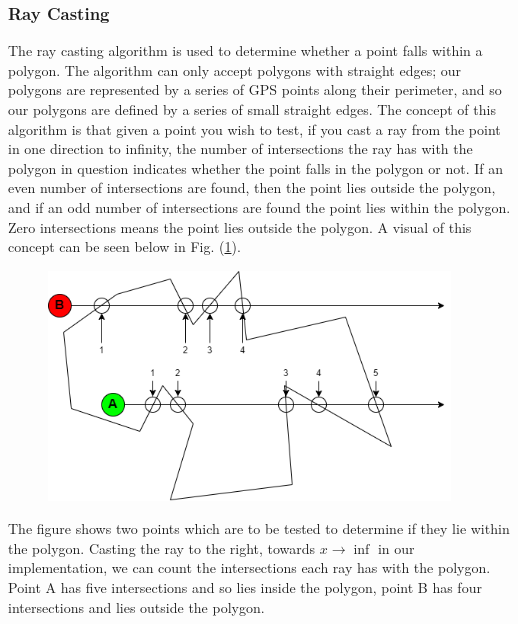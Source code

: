 \documentclass[11pt,landscape]{article}
\begin{document}
\begin{multicols}{3}
\subsubsection{Ray Casting}
The ray casting algorithm is used to determine whether a point falls within a
polygon. The algorithm can only accept polygons with straight edges; our
polygons are represented by a series of GPS points along their perimeter, and so
our polygons are defined by a series of small straight edges. The concept of
this algorithm is that given a point you wish to test, if you cast a ray from
the point in one direction to infinity, the number of intersections the ray has
with the polygon in question indicates whether the point falls in the polygon or
not. If an even number of intersections are found, then the point lies outside
the polygon, and if an odd number of intersections are found the point lies
within the polygon. Zero intersections means the point lies outside the polygon.
A visual of this concept can be seen below in Fig. (\ref{fig:raycasting}).
\begin{figure}[H]
    \begin{mdframed}
        \begin{center}
            \includegraphics[width=0.95\textwidth]{raycasting.png}
        \end{center}
    \end{mdframed}
    \label{fig:raycasting}
\end{figure}

The figure shows two points which are to be tested to determine if they lie
within the polygon. Casting the ray to the right, towards $x\rightarrow\inf$ in
our implementation, we can count the intersections each ray has with the
polygon. Point A has five intersections and so lies inside the polygon, point B
has four intersections and lies outside the polygon. 


\end{multicols}
\end{document}
